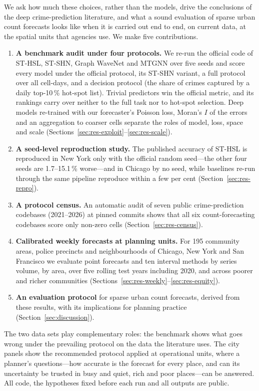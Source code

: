 \documentclass[preprint,12pt,authoryear]{elsarticle}
\begin{document}
We ask how much these choices, rather than the models, drive the conclusions of the deep crime-prediction literature, and what a sound evaluation of sparse urban count forecasts looks like when it is carried out end to end, on current data, at the spatial units that agencies use. We make five contributions.

\begin{enumerate}[leftmargin=*,itemsep=2pt]
\item \textbf{A benchmark audit under four protocols.} We re-run the official code of ST-HSL, ST-SHN, Graph WaveNet and MTGNN over five seeds and score every model under the official protocol, its ST-SHN variant, a full protocol over all cell-days, and a decision protocol (the share of crimes captured by a daily top-10\,\% hot-spot list). Trivial predictors win the official metric, and its rankings carry over neither to the full task nor to hot-spot selection. Deep models re-trained with our forecaster's Poisson loss, Moran's $I$ of the errors and an aggregation to coarser cells separate the roles of model, loss, space and scale (Sections~\ref{sec:res-exploit}--\ref{sec:res-scale}).
\item \textbf{A seed-level reproduction study.} The published accuracy of ST-HSL is reproduced in New York only with the official random seed---the other four seeds are 1.7--15.1\,\% worse---and in Chicago by no seed, while baselines re-run through the same pipeline reproduce within a few per cent (Section~\ref{sec:res-repro}).
\item \textbf{A protocol census.} An automatic audit of seven public crime-prediction codebases (2021--2026) at pinned commits shows that all six count-forecasting codebases score only non-zero cells (Section~\ref{sec:res-census}).
\item \textbf{Calibrated weekly forecasts at planning units.} For 195 community areas, police precincts and neighbourhoods of Chicago, New York and San Francisco we evaluate point forecasts and ten interval methods by series volume, by area, over five rolling test years including 2020, and across poorer and richer communities (Sections~\ref{sec:res-weekly}--\ref{sec:res-equity}).
\item \textbf{An evaluation protocol} for sparse urban count forecasts, derived from these results, with its implications for planning practice (Section~\ref{sec:discussion}).
\end{enumerate}

The two data sets play complementary roles: the benchmark shows what goes wrong under the prevailing protocol on the data the literature uses. The city panels show the recommended protocol applied at operational units, where a planner's questions---how accurate is the forecast for every place, and can its uncertainty be trusted in busy and quiet, rich and poor places---can be answered. All code, the hypotheses fixed before each run and all outputs are public.
\end{document}
